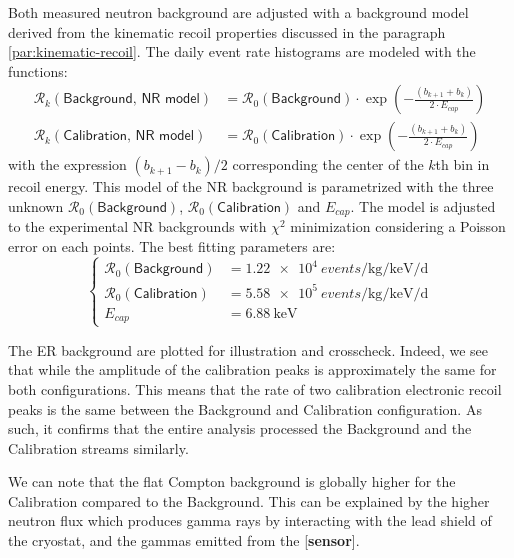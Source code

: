 Both measured neutron background are adjusted with a background model derived from the kinematic recoil properties discussed in the paragraph \ref{par:kinematic-recoil}. The daily event rate histograms are modeled with the functions:
\begin{align}
\mathcal{R}_k(\textsf{Background, NR model}) &= \mathcal{R}_0(\textsf{Background}) \cdot \exp
 \left( - \frac{ (b_{k+1} + b_{k}) }{2 \cdot E_{cap}} \right)
 \\
\mathcal{R}_k(\textsf{Calibration, NR model}) &= \mathcal{R}_0(\textsf{Calibration}) \cdot \exp 
 \left( - \frac{ (b_{k+1} + b_{k}) }{2 \cdot E_{cap}} \right)
\end{align}
with the expression $(b_{k+1} - b_{k})/2$ corresponding the center of the $k$th bin in recoil energy. This model of the NR background is parametrized with the three unknown $\mathcal{R}_0(\textsf{Background})$, $\mathcal{R}_0(\textsf{Calibration})$ and $E_{cap}$. The model is adjusted to the experimental NR backgrounds with $\chi^2$ minimization considering a Poisson error on each points. The best fitting parameters are:
\begin{equation}
\begin{cases}
\mathcal{R}_0(\textsf{Background}) &= \SI{1.22e4}{events \per \kg \per \kilo\eV \per \day}
\\
\mathcal{R}_0(\textsf{Calibration}) &= \SI{5.58e5}{events \per \kg \per \kilo\eV \per \day}
\\
E_{cap} &= \SI{6.88}{\kilo\eV}
\end{cases}
\end{equation} 


The ER background are plotted for illustration and crosscheck. Indeed, we see that while the amplitude of the calibration peaks is approximately the same for both configurations. This means that the rate of two calibration electronic recoil peaks is the same between the Background and Calibration configuration. As such, it confirms that the entire analysis processed the Background and the Calibration streams similarly. 

We can note that the flat Compton background is globally higher for the Calibration compared to the Background. This can be explained by the higher neutron flux which produces gamma rays by interacting with the lead shield of the cryostat, and the gammas emitted from the [\textbf{sensor}].

